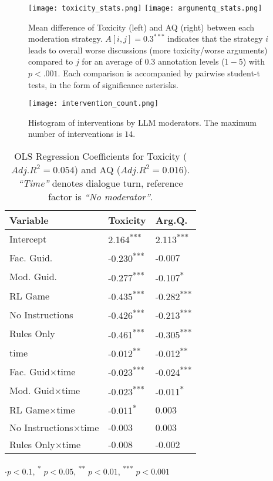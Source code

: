 \begin{figure*}[t]
    \texttt{[image: toxicity\_stats.png]} \hfill
    \texttt{[image: argumentq\_stats.png]}
	\centering
	\caption{Mean difference of Toxicity (left) and \ac{AQ} (right) between each moderation strategy. $A[i, j] = 0.3^{***}$ indicates that the strategy $i$ leads to overall worse discussions (more toxicity/worse arguments) compared to $j$ for an average of $0.3$ annotation levels ($1-5$) with $p<.001$. Each comparison is accompanied by pairwise student-t tests, in the form of significance asterisks.}
	\label{fig::toxicity_aq_stats}
\end{figure*}

\begin{figure}
	\centering
	\texttt{[image: intervention\_count.png]}
	\caption{Histogram of interventions by \ac{LLM} moderators. The maximum number of interventions is $14$.}
	\label{fig::intervention_count}
\end{figure}

\begin{table}
\centering
    \begin{tabular}{lll}
        \toprule
        \textbf{Variable} & \textbf{Toxicity} & \textbf{Arg.Q.} \\
        \midrule
        Intercept & 2.164\textsuperscript{***} & 2.113\textsuperscript{***} \\
        Fac. Guid. & -0.230\textsuperscript{***} & -0.007 \\
        Mod. Guid. & -0.277\textsuperscript{***} & -0.107\textsuperscript{*} \\
        \ac{RL} Game & -0.435\textsuperscript{***} & -0.282\textsuperscript{***} \\
        No Instructions & -0.426\textsuperscript{***} & -0.213\textsuperscript{***} \\
        Rules Only & -0.461\textsuperscript{***} & -0.305\textsuperscript{***} \\
        time & -0.012\textsuperscript{**} & -0.012\textsuperscript{**} \\
        Fac. Guid$\times$time & -0.023\textsuperscript{***} & -0.024\textsuperscript{***} \\
        Mod. Guid$\times$time & -0.023\textsuperscript{***} & -0.011\textsuperscript{*} \\
        \ac{RL} Game$\times$time & -0.011\textsuperscript{*} & 0.003 \\
        No Instructions$\times$time & -0.003 & 0.003 \\
        Rules Only$\times$time & -0.008 & -0.002 \\
        \bottomrule
    \end{tabular}
    \small
    $\cdot p<0.1$, \textsuperscript{*} $p<0.05$, \textsuperscript{**} $p<0.01$, \textsuperscript{***} $p<0.001$
    \normalsize
    \caption{OLS Regression Coefficients for Toxicity ($Adj. R^2=0.054$) and \ac{AQ} ($Adj. R^2=0.016$). \textit{“Time”} denotes dialogue turn, reference factor is \textit{“No moderator”}.}
    \label{tab:timeseries}
\end{table}



